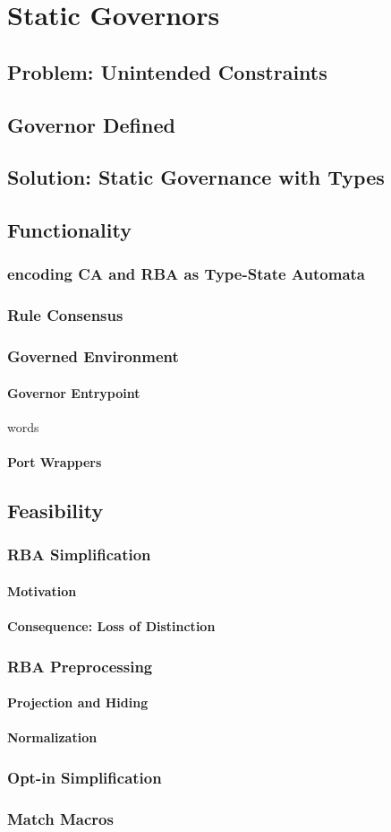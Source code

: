 \chapter{Static Governors}
\section{Problem: Unintended Constraints}
\section{Governor Defined}
\section{Solution: Static Governance with Types}
\section{Functionality}
\subsection{encoding CA and RBA as Type-State Automata}
\subsection{Rule Consensus}
\subsection{Governed Environment}
\subsubsection{Governor Entrypoint}
words
\subsubsection{Port Wrappers}
\section{Feasibility}
\subsection{RBA Simplification}
\subsubsection{Motivation}
\subsubsection{Consequence: Loss of Distinction}
\subsection{RBA Preprocessing}
\subsubsection{Projection and Hiding}
\subsubsection{Normalization}
\subsection{Opt-in Simplification}
\subsection{Match Macros}